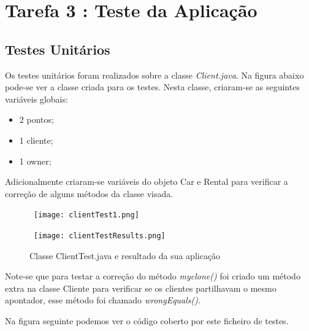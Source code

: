 \section{Tarefa 3 : Teste da Aplicação}

\subsection{Testes Unitários}

\par Os testes unitários foram realizados sobre a classe \textit{Client.java}.
Na figura abaixo pode-se ver a classe criada para os testes.\newline
Nesta classe, criaram-se as seguintes variáveis globais:
\begin{itemize}
\item 2 pontos;
\item 1 cliente;
\item 1 owner;
\end{itemize}

\par Adicionalmente criaram-se variáveis do objeto Car e Rental para verificar a correção de alguns métodos da classe visada.

\begin{figure}[H]

  \centering

  \hbox{\hspace{-6em} \texttt{[image: clientTest1.png]}}

\end{figure}

\begin{figure}[H]

  \centering

  \hbox{\hspace{-8em} \texttt{[image: clientTestResults.png]}}

  \caption {Classe ClientTest.java e resultado da sua aplicação}

  \label {fig30}

\end{figure}
\par Note-se que para testar a correção do método \textit{myclone()} foi criado um método extra na classe Cliente para verificar se os clientes partilhavam o mesmo apontador, esse método foi chamado \textit{wrongEquals()}.

\par Na figura seguinte podemos ver o código coberto por este ficheiro de testes.\newline

